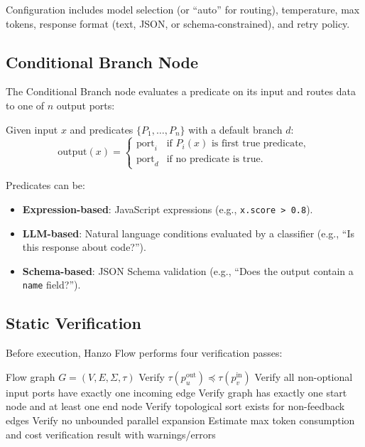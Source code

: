 Configuration includes model selection (or ``auto'' for routing), temperature, max tokens, response format (text, JSON, or schema-constrained), and retry policy.

\subsection{Conditional Branch Node}

The Conditional Branch node evaluates a predicate on its input and routes data to one of $n$ output ports:

\begin{definition}
Given input $x$ and predicates $\{P_1, \ldots, P_n\}$ with a default branch $d$:
\begin{equation}
\text{output}(x) = \begin{cases}
\text{port}_i & \text{if } P_i(x) \text{ is first true predicate}, \\
\text{port}_d & \text{if no predicate is true}.
\end{cases}
\end{equation}
\end{definition}

Predicates can be:
\begin{itemize}[leftmargin=1.1em]
    \item \textbf{Expression-based}: JavaScript expressions (e.g., \texttt{x.score > 0.8}).
    \item \textbf{LLM-based}: Natural language conditions evaluated by a classifier (e.g., ``Is this response about code?'').
    \item \textbf{Schema-based}: JSON Schema validation (e.g., ``Does the output contain a \texttt{name} field?'').
\end{itemize}

\subsection{Static Verification}

Before execution, Hanzo Flow performs four verification passes:

\begin{algorithm}[H]
\caption{Static Flow Verification}
\label{alg:verify}
\begin{algorithmic}[1]
\Require Flow graph $G = (V, E, \Sigma, \tau)$
\State {}
    \State Verify $\tau(p_u^{\text{out}}) \preceq \tau(p_v^{\text{in}})$
\EndFor
\State {}
\State Verify all non-optional input ports have exactly one incoming edge
\State Verify graph has exactly one start node and at least one end node
\State {}
\State Verify topological sort exists for non-feedback edges
\State {}
\State Verify no unbounded parallel expansion
\State Estimate max token consumption and cost
\State \Return verification result with warnings/errors
\end{algorithmic}
\end{algorithm}

